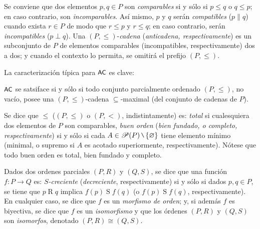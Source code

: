     Se conviene que dos elementos $p,q \in P$ son \textit{comparables} si y sólo si $p \leq q$ o $q \leq p$; en caso contrario, son \textit{incomparables}. Así mismo, $p$ y $q$ serán \textit{compatibles} ($p \parallel q$) cuando exista $r \in P$ de modo que $r \leq p$ y $r \leq q$; en caso contrario, serán \textit{incompatibles} ($p \perp q$). Una $(P,\leq)$-\textit{cadena} (\textit{anticadena, respectivamente}) es un subconjunto de $P$ de elementos comparables (incompatibles, respectivamente) dos a dos; y cuando el contexto lo permita, se omitirá el prefijo $(P,\leq)$.

    La caracterización típica para $\text{\textsf{\small AC}}$ es clave:

    \begin{teorema}\label{teo-PMH}
        $\text{\textsf{\small AC}}$ se satsiface si y sólo si todo conjunto parcialmente ordenado $(P, \leq)$, no vacío, posee una $(P,\leq)$-cadena $\subseteq$-maximal (del conjunto de cadenas de $P$).
    \end{teorema}

    Se dice que $\leq$ ($(P,\leq)$ o $(P,<)$, indistintamente) es: \textit{total} si cualesquiera dos elementos de $P$ son comparables, \textit{buen orden} (\textit{bien fundado, o completo, respectivamente}) si y sólo si cada $A \in \ms{P}(P) \setminus \{\emptyset\}$ tiene elemento mínimo (minimal, o supremo si $A$ es acotado superiormente, respectivamente). Nótese que todo buen orden es total, bien fundado y completo.

    Dados dos ordenes parciales $(P,R)$ y $(Q,S)$, se dice que una función $f:P \to Q$ es: \textit{$S$-creciente} (\textit{decreciente}, respectivamente) si y sólo si dados $p,q \in P$, se tiene que $p \mathrel{R} q$ implica $f(p) \mathrel{S} f(q)$ (o $f(p) \mathrel{S} f(q)$, respectivamente). En cualquier caso, se dice que $f$ es un \textit{morfismo de orden}; y, si además $f$ es biyectiva, se dice que $f$ es un \textit{isomorfismo} y que los órdenes $(P,R)$ y $(Q,S)$ son \textit{isomorfos}, denotado $(P,R) \cong (Q,S)$.

